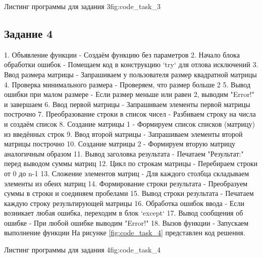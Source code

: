 \documentclass[]{vvsu}
\begin{document}
\begin{vvsu_figure}{Листинг программы для задания 3}{fig:code_task_3}
  \begin{minipage}{.75\textwidth}
    
  \end{minipage}
\end{vvsu_figure}

\subsection{Задание 4}

1. Объявление функции - Создаём функцию   без параметров  
2. Начало блока обработки ошибок - Помещаем код в конструкцию `try` для отлова исключений  
3. Ввод размера матрицы - Запрашиваем у пользователя размер квадратной матрицы  
4. Проверка минимального размера - Проверяем, что размер больше 2  
5. Вывод ошибки при малом размере - Если размер меньше или равен 2, выводим "Error!" и завершаем  
6. Ввод первой матрицы - Запрашиваем элементы первой матрицы построчно  
7. Преобразование строки в список чисел - Разбиваем строку на числа и создаём список  
8. Создание матрицы 1 - Формируем список списков (матрицу) из введённых строк  
9. Ввод второй матрицы - Запрашиваем элементы второй матрицы построчно  
10. Создание матрицы 2 - Формируем вторую матрицу аналогичным образом  
11. Вывод заголовка результата - Печатаем "Результат:" перед выводом суммы матриц  
12. Цикл по строкам матрицы - Перебираем строки от 0 до n-1  
13. Сложение элементов матриц - Для каждого столбца складываем элементы из обеих матриц  
14. Формирование строки результата - Преобразуем суммы в строки и соединяем пробелами  
15. Вывод строки результата - Печатаем каждую строку результирующей матрицы  
16. Обработка ошибок ввода - Если возникает любая ошибка, переходим в блок `except`  
17. Вывод сообщения об ошибке - При любой ошибке выводим "Error!"  
18. Вызов функции - Запускаем выполнение функции На рисунке \ref{fig:code_task_4} представлен код решения.

\begin{vvsu_figure}{Листинг программы для задания 4}{fig:code_task_4}
  \begin{minipage}{.75\textwidth}
    
  \end{minipage}
\end{vvsu_figure}
\end{document}
